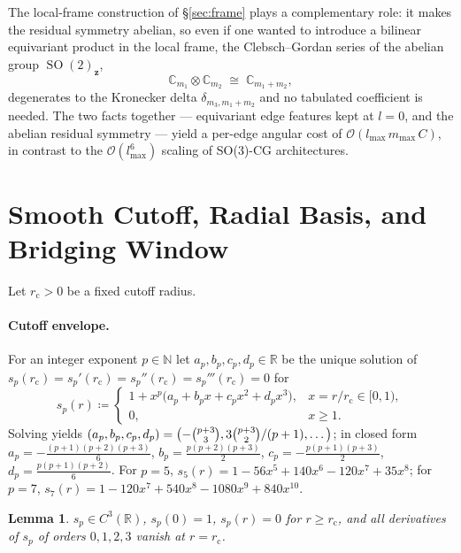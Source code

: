 \documentclass[11pt,a4paper]{article}
\DeclareMathOperator{\SO}{SO}
\newcommand{\R}{\mathbb{R}}
\newcommand{\N}{\mathbb{N}}
\newcommand{\C}{\mathbb{C}}
\newcommand{\bz}{\bm{z}}
\newcommand{\rcut}{r_{\mathrm{c}}}
\newcommand{\lmax}{l_{\max}}
\newcommand{\mmax}{m_{\max}}
\theoremstyle{plain}
\newtheorem{lemma}[theorem]{Lemma}
\theoremstyle{definition}
\theoremstyle{remark}
\begin{document}
The local-frame construction of \S\ref{sec:frame} plays a complementary role:
it makes the residual symmetry abelian, so even if one wanted to introduce a
bilinear equivariant product in the local frame, the Clebsch--Gordan series of
the abelian group $\SO(2)_{\bz}$,
\begin{equation}\label{eq:so2-cg}
    \C_{m_1}\otimes\C_{m_2}\;\cong\;\C_{m_1+m_2},
\end{equation}
degenerates to the Kronecker delta $\delta_{m_3,m_1+m_2}$ and no tabulated coefficient is needed.
The two facts together — equivariant edge features kept at $l=0$, and the abelian residual symmetry — yield a per-edge angular cost of $\mathcal{O}(\lmax\,\mmax\,C)$, in contrast to the $\mathcal{O}(\lmax^6)$ scaling of SO(3)-CG architectures.

\section{Smooth Cutoff, Radial Basis, and Bridging Window}\label{sec:radial}

Let $\rcut>0$ be a fixed cutoff radius.

\paragraph{Cutoff envelope.}
For an integer exponent $p\in\N$ let $a_p,b_p,c_p,d_p\in\R$ be the unique
solution of $s_p(\rcut)=s_p'(\rcut)=s_p''(\rcut)=s_p'''(\rcut)=0$ for
\begin{equation}\label{eq:env}
    s_p(r) \coloneqq\begin{cases}
        1+x^p\bigl(a_p+b_p x+c_p x^2+d_p x^3\bigr), & x=r/\rcut\in[0,1), \\[2pt]
        0,                                          & x\geq 1.
    \end{cases}
\end{equation}
Solving yields $(a_p,b_p,c_p,d_p)=\bigl(-\tbinom{p+3}{3},3\tbinom{p+3}{2}/{(p+1)},\dots\bigr)$;
in closed form
\(
a_p=-\tfrac{(p+1)(p+2)(p+3)}{6}
\), \(
b_p=\tfrac{p(p+2)(p+3)}{2}
\), \(
c_p=-\tfrac{p(p+1)(p+3)}{2}
\), \(
d_p=\tfrac{p(p+1)(p+2)}{6}
\).
For $p=5$, $s_5(r)=1-56x^5+140x^6-120x^7+35x^8$;
for $p=7$, $s_7(r)=1-120x^7+540x^8-1080x^9+840x^{10}$.

\begin{lemma}\label{lem:envelope}
    $s_p\in C^3(\R)$, $s_p(0)=1$, $s_p(r)=0$ for $r\geq\rcut$, and all derivatives of $s_p$ of orders $0,1,2,3$ vanish at $r=\rcut$.
\end{lemma}
\end{document}
